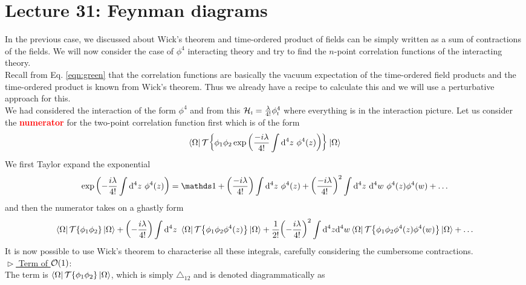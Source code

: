 \section*{Lecture 31: Feynman diagrams}
In the previous case, we discussed about Wick's theorem and time-ordered product of fields can be simply written as a sum of contractions of the fields. We will now consider the case of $\phi^4$ interacting theory and try to find the $n$-point correlation functions of the interacting theory. \\[0.2cm]
Recall from Eq. \ref{eqn:green} that the correlation functions are basically the vacuum expectation of the time-ordered field products and the time-ordered product is known from Wick's theorem. Thus we already have a recipe to calculate this and we will use a perturbative approach for this. \\[0.2cm]
We had considered the interaction of the form $\phi^4$ and from this $\mathcal H_{\text{\tiny I}} = \frac{\lambda}{4!}\phi_{\text{\tiny I}}^4$ where everything is in the interaction picture. Let us consider the \textbf{\textcolor{red}{numerator}} for the two-point correlation function first which is of the form 
$$\bra{\Omega} \mathcal T\qty{\phi_1 \phi_2 \exp\qty(\frac{-i\lambda}{4!} \int \dd^4 z\ \phi^4(z))}\ket{\Omega}$$ We first Taylor expand the exponential
$$\exp\qty(-\frac{i\lambda}{4!} \int \dd^4 z\ \phi^4(z) ) = \iden + \qty(\frac{-i\lambda}{4!})\int\dd^4z\ \phi^4(z) +\qty(\frac{-i\lambda}{4!})^2\int\dd^4z\ \dd^4w\ \phi^4(z) \phi^4(w)+\ldots $$
and then the numerator takes on a ghastly form
$$\bra{\Omega} \mathcal T\qty{\phi_1 \phi_2 }\ket{\Omega} + \qty(-\frac{i\lambda}{4!})\int \dd^4 z \ \bra{\Omega}\mathcal T\qty{\phi_1 \phi_2 \phi^4(z)}\ket{\Omega} + \frac{1}{2!}\qty(-\frac{i\lambda}{4!})^2\int \dd^4 z \dd^4 w \bra{\Omega} \mathcal T\qty{\phi_1\phi_2 \phi^4(z)\phi^4(w)}\ket{\Omega}+ \ldots$$
It is now possible to use Wick's theorem to characterise all these integrals, carefully considering the cumbersome contractions. \\[0.2cm]
$\vartriangleright $\underline{ Term of $\mathcal O(1)$}:\\[0.2cm]
The term is  $\bra{\Omega} \mathcal T\qty{\phi_1 \phi_2 }\ket{\Omega}$, which is simply $\triangle_{12}$ and is denoted diagrammatically as 
\begin{figure}[H]
    \centering
{}
\end{figure}
